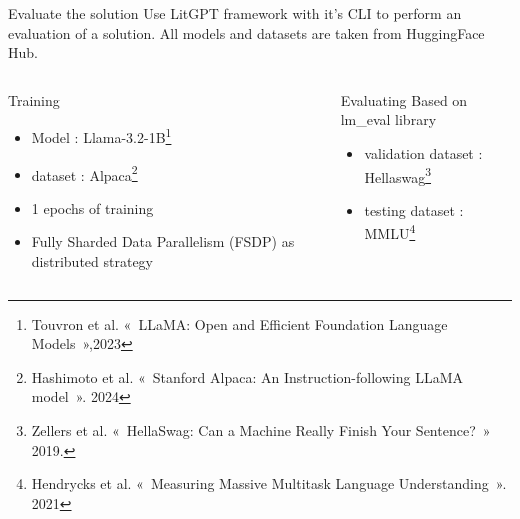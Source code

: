 \begin{frame}{Evaluate the solution}
    Use LitGPT framework with it's CLI to perform an evaluation of a solution. All models and datasets are taken from HuggingFace Hub.


    \begin{columns}
        \begin{column}[t]{0.45\textwidth}
            \begin{block}{Training}
                \begin{itemize}
                    \item Model : Llama-3.2-1B\footnote[2]{Touvron et al. « LLaMA: Open and Efficient Foundation Language Models »,2023}
                    \item dataset : Alpaca\footnote[3]{Hashimoto et al. « Stanford Alpaca: An Instruction-following LLaMA model ». 2024}
                    \item 1 epochs of training
                    \item Fully Sharded Data Parallelism (FSDP) as distributed strategy
                \end{itemize}
            \end{block}
        \end{column}
        \begin{column}[t]{0.45\textwidth}
            \begin{block}{Evaluating}
                Based on lm\_eval library
                \begin{itemize}
                    \item validation dataset : Hellaswag\footnote[4]{Zellers et al. « HellaSwag: Can a Machine Really Finish Your Sentence? » 2019.
                    }
                    \item testing dataset : MMLU\footnote[5]{Hendrycks et al. « Measuring Massive Multitask Language Understanding ». 2021
                    }
                \end{itemize}
            \end{block}
        \end{column}
    \end{columns}

    
\end{frame}